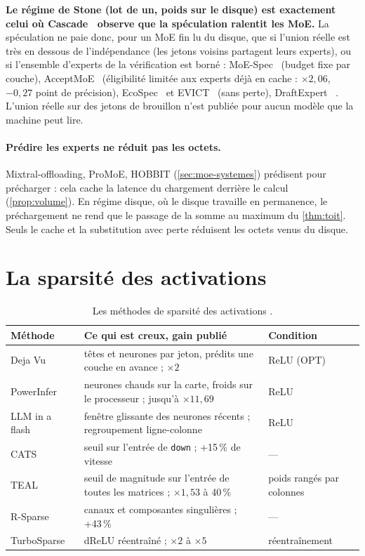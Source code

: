 \textbf{Le régime de Stone (lot de un, poids sur le disque) est exactement celui où Cascade~\cite{cascade2025} observe que la spéculation ralentit les MoE.} La spéculation ne paie donc, pour un MoE fin lu du disque, que si l'union réelle est très en dessous de l'indépendance (les jetons voisins partagent leurs experts), ou si l'ensemble d'experts de la vérification est borné : MoE-Spec~\cite{moespec2026} (budget fixe par couche), AcceptMoE~\cite{acceptmoe2026} (éligibilité limitée aux experts déjà en cache : $\times2{,}06$, $-0{,}27$ point de précision), EcoSpec~\cite{ecospec2026} et EVICT~\cite{evict2026} (sans perte), DraftExpert~\cite{draftexpert2026} \litt. L'union réelle sur des jetons de brouillon n'est publiée pour aucun modèle que la machine peut lire.

\paragraph{Prédire les experts ne réduit pas les octets.} Mixtral-offloading, ProMoE, HOBBIT (\cref{sec:moe-systemes}) prédisent pour précharger : cela cache la latence du chargement derrière le calcul (\cref{prop:volume}). En régime disque, où le disque travaille en permanence, le préchargement ne rend que le passage de la somme au maximum du \cref{thm:toit}. Seuls le cache et la substitution avec perte réduisent les octets venus du disque.

\section{La sparsité des activations}\label{sec:sparsite-activations}

\begin{table}[ht]
\centering\small
\caption[Les méthodes de sparsité des activations]{Les méthodes de sparsité des activations \litt.}
\label{tab:sparsite}
\begin{tabularx}{\linewidth}{@{}lXl@{}}
\toprule
Méthode & Ce qui est creux, gain publié & Condition \\
\midrule
Deja Vu~\cite{dejavu2023} & têtes et neurones par jeton, prédits une couche en avance ; $\times2$ & ReLU (OPT) \\
PowerInfer~\cite{powerinfer2024} & neurones chauds sur la carte, froids sur le processeur ; jusqu'à $\times11{,}69$ & ReLU \\
LLM in a flash~\cite{llminflash2024} & fenêtre glissante des neurones récents ; regroupement ligne-colonne & ReLU \\
CATS~\cite{cats2024} & seuil sur l'entrée de \texttt{down} ; +15\,\% de vitesse & --- \\
TEAL~\cite{teal2024} & seuil de magnitude sur l'entrée de toutes les matrices ; $\times1{,}53$ à 40\,\% & poids rangés par colonnes \\
R-Sparse~\cite{rsparse2025} & canaux et composantes singulières ; +43\,\% & --- \\
TurboSparse~\cite{turbosparse2024} & dReLU réentraîné ; $\times2$ à $\times5$ & réentraînement \\
\bottomrule
\end{tabularx}
\end{table}

